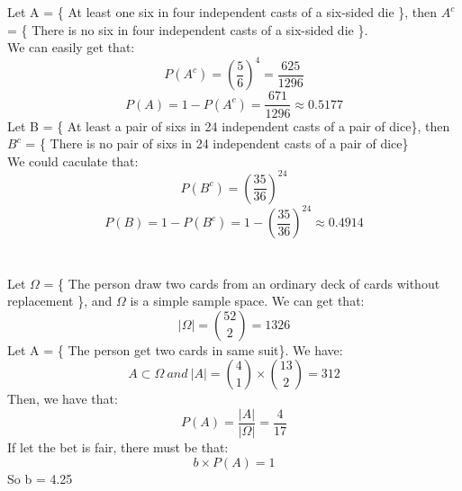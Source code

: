 \documentclass[10.5pt]{article}
\begin{document}
\section{}
Let A = \{ At least one six in four independent casts of a six-sided die \}, then $A^c$ = \{ There is no six in four independent casts of a six-sided die \}.\\
\indent
We can easily get that:
\begin{equation*}
    P(A^c) = (\frac{5}{6})^4 = \frac{625}{1296}
\end{equation*}
\begin{equation*}
    P(A) = 1 - P(A^c) = \frac{671}{1296} \approx 0.5177
\end{equation*}
\indent
Let B = \{ At least a pair of sixs in 24 independent casts of a pair of dice\}, then $B^c$ = \{ There is no pair of sixs in 24 independent casts of a pair of dice\}\\
\indent
We could caculate that:
\begin{equation*}
    P(B^c) = (\frac{35}{36})^{24}
\end{equation*}
\begin{equation*}
    P(B) = 1 - P(B^c) = 1 - (\frac{35}{36})^{24}\approx 0.4914
\end{equation*}

\section{}
Let $\Omega$ = \{ The person draw two cards from an ordinary deck of cards without replacement \}, and $\Omega$ is a simple sample space. We can get that:
\begin{equation*}
    \left\lvert \Omega\right\rvert = \binom{52}{2} = 1326
\end{equation*}
\indent
Let A = \{ The person get two cards in same suit\}. We have:
\begin{equation*}
    A\subset \Omega ~and~ \left\lvert A \right\rvert = \binom{4}{1}\times \binom{13}{2} = 312
\end{equation*}
\indent
Then, we have that:
\begin{equation*}
    P(A) = \frac{\left\lvert A\right\rvert }{\left\lvert \Omega \right\rvert } = \frac{4}{17}
\end{equation*}
\indent
If let the bet is fair, there must be that:
\begin{equation*}
    b\times P(A) = 1
\end{equation*}
\indent
So b = 4.25
\end{document}
